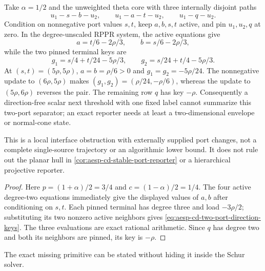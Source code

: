 \begin{proposition}
\label{prop:aesp-cd-two-port-direction-stop}
Take $\alpha=1/2$ and the unweighted theta core with three internally disjoint
paths
\begin{equation*}
 u_1-s-b-u_2,\qquad u_1-a-t-u_2,\qquad u_1-q-u_2.
\end{equation*}
Condition on nonnegative port values $s,t$, keep $a,b,s,t$ active, and pin
$u_1,u_2,q$ at zero.  In the degree-unscaled RPPR system, the active equations
give
\begin{equation*}
 a=t/6-2\rho/3,\qquad b=s/6-2\rho/3,
\end{equation*}
while the two pinned terminal keys are
\begin{equation}
 g_1=s/4+t/24-5\rho/3,\qquad
 g_2=s/24+t/4-5\rho/3.
 \label{eq:aesp-cd-two-port-direction-keys}
\end{equation}
At $(s,t)=(5\rho,5\rho)$, $a=b=\rho/6>0$ and
$g_1=g_2=-5\rho/24$.  The nonnegative update to $(6\rho,5\rho)$ makes
$(g_1,g_2)=(\rho/24,-\rho/6)$, whereas the update to
$(5\rho,6\rho)$ reverses the pair.  The remaining row $q$ has key $-\rho$.
Consequently a direction-free scalar next threshold with one fixed label
cannot summarize this two-port separator; an exact reporter needs at least a
two-dimensional envelope or normal-cone state.

This is a local interface obstruction with externally supplied port changes,
not a complete single-source trajectory or an algorithmic lower bound.  It
does not rule out the planar hull in
\cref{cor:aesp-cd-stable-port-reporter} or a hierarchical projective reporter.
\end{proposition}

\begin{proof}
Here $p=(1+\alpha)/2=3/4$ and $c=(1-\alpha)/2=1/4$.  The four active
degree-two equations immediately give the displayed values of $a,b$ after
conditioning on $s,t$.  Each pinned terminal has degree three and load
$-3\rho/2$; substituting its two nonzero active neighbors gives
\cref{eq:aesp-cd-two-port-direction-keys}.  The three evaluations are exact
rational arithmetic.  Since $q$ has degree two and both its neighbors are
pinned, its key is $-\rho$.
\end{proof}

The exact missing primitive can be stated without hiding it inside the Schur
solver.

